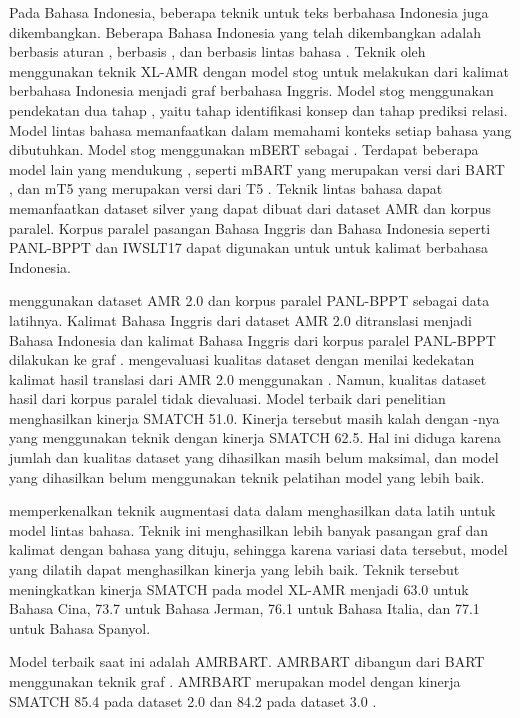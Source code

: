 Pada Bahasa Indonesia, beberapa teknik \amrparsing{} untuk teks berbahasa Indonesia juga dikembangkan.
Beberapa \amrparsing{} Bahasa Indonesia yang telah dikembangkan adalah \amrparsing{} berbasis aturan , berbasis  , dan berbasis lintas bahasa .
Teknik \amrparsing{} oleh \textcite{putra2022} menggunakan teknik  \gls{XL-AMR}  dengan model \gls{stog}  untuk melakukan \amrparsing{} dari kalimat berbahasa Indonesia menjadi graf \AMR{} berbahasa Inggris.
Model \gls{stog} menggunakan pendekatan dua tahap , yaitu tahap identifikasi konsep dan tahap prediksi relasi.
Model \amrparsing{} lintas bahasa memanfaatkan \mwordem{} dalam memahami konteks setiap bahasa yang dibutuhkan.
Model \gls{stog} menggunakan mBERT  sebagai \mwordem{}.
Terdapat beberapa model lain yang mendukung \mwordem{}, seperti mBART  yang merupakan versi \multil{} dari \gls{BART} , dan mT5  yang merupakan versi \multil{} dari T5 .
Teknik \amrparsing{} lintas bahasa dapat memanfaatkan dataset silver yang dapat dibuat dari dataset AMR dan korpus paralel.
Korpus paralel pasangan Bahasa Inggris dan Bahasa Indonesia seperti PANL-BPPT  dan IWSLT17  dapat digunakan untuk \amrparsing{} untuk kalimat berbahasa Indonesia.

\textcite{putra2022} menggunakan dataset AMR 2.0 dan korpus paralel PANL-BPPT sebagai data latihnya.
Kalimat Bahasa Inggris dari dataset AMR 2.0 ditranslasi menjadi Bahasa Indonesia dan kalimat Bahasa Inggris dari korpus paralel PANL-BPPT dilakukan  ke graf \AMR{}.
\textcite{putra2022} mengevaluasi kualitas dataset dengan menilai kedekatan kalimat hasil translasi dari AMR 2.0 menggunakan \cossim{}.
Namun, kualitas dataset hasil \amrparsing{} dari korpus paralel tidak dievaluasi.
Model terbaik dari penelitian \textcite{putra2022} menghasilkan kinerja SMATCH 51.0.
Kinerja tersebut masih kalah dengan -nya yang menggunakan teknik  dengan kinerja SMATCH 62.5.
Hal ini diduga karena jumlah dan kualitas dataset yang dihasilkan masih belum maksimal, dan model yang dihasilkan belum menggunakan teknik pelatihan model yang lebih baik.

\textcite{lee2022} memperkenalkan teknik augmentasi data dalam menghasilkan data latih untuk model \amrparsing{} lintas bahasa.
Teknik ini menghasilkan lebih banyak pasangan graf \AMR{} dan kalimat dengan bahasa yang dituju, sehingga karena variasi data tersebut, model yang dilatih dapat menghasilkan kinerja yang lebih baik.
Teknik tersebut meningkatkan kinerja SMATCH pada model XL-AMR  menjadi 63.0 untuk Bahasa Cina, 73.7 untuk Bahasa Jerman, 76.1 untuk Bahasa Italia, dan 77.1 untuk Bahasa Spanyol.

Model \amrparsing{} terbaik saat ini adalah \gls{AMRBART}.
\gls{AMRBART} dibangun dari  \gls{BART} menggunakan teknik graf \pretraining{}.
\gls{AMRBART} merupakan model \sota{} dengan kinerja SMATCH 85.4 pada dataset \AMR{} 2.0 dan 84.2 pada dataset \AMR{} 3.0 .
